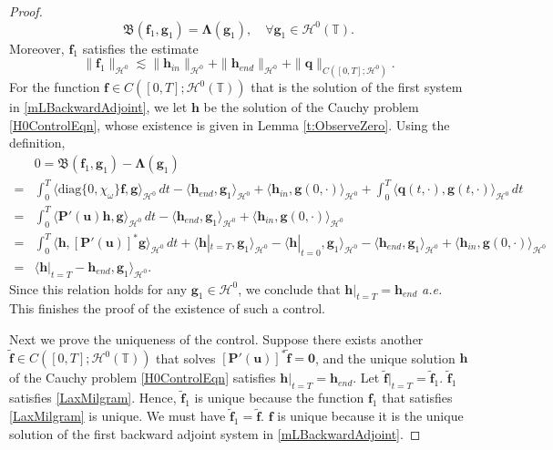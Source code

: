 \documentclass[12pt]{amsart}
\theoremstyle{remark}
\theoremstyle{definition}
\numberwithin{equation}{section}
\renewcommand{\H}{{\mathcal H }}
\newcommand{\T}{{\mathbb T}}
\begin{document}
\begin{proof}
\begin{equation} \label{LaxMilgram}
\mathfrak{B}( \mathbf{f}_1,  \mathbf{g}_1) = \mathbf{\Lambda}(\mathbf{g}_1), \quad \forall \mathbf{g}_1 \in \H^0(\T).
\end{equation}
Moreover, $\mathbf{f}_1$ satisfies the estimate
\begin{equation*}
    \|\mathbf{f}_1\|_{\H^0} \lesssim \|\mathbf{h}_{in}\|_{\H^0} + \|\mathbf{h}_{end}\|_{\H^0} + \|\mathbf{q}\|_{C([0,T];\H^0)}.
\end{equation*}
For the function $\mathbf{f}\in C([0,T]; \H^0(\T))$ that is the solution of the first system in \eqref{mLBackwardAdjoint}, we let $\mathbf{h}$ be the solution of the Cauchy problem \eqref{H0ControlEqn}, whose existence is given in Lemma \ref{t:ObserveZero}.
Using the definition,
\begin{align*}
 &0 = \mathfrak{B}( \mathbf{f}_1,  \mathbf{g}_1) - \mathbf{\Lambda}(\mathbf{g}_1) \\
 =& \int_0^T \langle \text{diag}\{0, \chi_\omega \}  \mathbf{f},  \mathbf{g}\rangle_{\H^0} \,dt - \langle   \mathbf{h}_{end},  \mathbf{g}_1\rangle_{\H^0} + \langle   \mathbf{h}_{in},  \mathbf{g}(0,\cdot)\rangle_{\H^0} +\int_0^T \langle   \mathbf{q}(t,\cdot),  \mathbf{g}(t,\cdot)\rangle_{\H^0} \,dt \\
 =& \int_0^T \langle \mathbf{P}'(\mathbf{u}) \mathbf{h},  \mathbf{g}\rangle_{\H^0} \,dt - \langle   \mathbf{h}_{end},  \mathbf{g}_1\rangle_{\H^0} + \langle   \mathbf{h}_{in},  \mathbf{g}(0,\cdot)\rangle_{\H^0}  \\
 =& \int_0^T \langle  \mathbf{h},  [\mathbf{P}'(\mathbf{u})]^*\mathbf{g}\rangle_{\H^0} \,dt + \langle   \mathbf{h}|_{t=T},  \mathbf{g}_1\rangle_{\H^0} - \langle   \mathbf{h}|_{t=0},  \mathbf{g}_1\rangle_{\H^0} - \langle   \mathbf{h}_{end},  \mathbf{g}_1\rangle_{\H^0} + \langle   \mathbf{h}_{in},  \mathbf{g}(0,\cdot)\rangle_{\H^0} \\
 =& \langle \mathbf{h}|_{t=T}-  \mathbf{h}_{end},  \mathbf{g}_1\rangle_{\H^0}. 
\end{align*}
Since this relation holds for any $\mathbf{g}_1\in \H^0$, we conclude that $\mathbf{h}|_{t=T}=  \mathbf{h}_{end}$ \textit{a.e.}
This finishes the proof of the existence of such a control.

Next we prove the uniqueness of the control. 
Suppose there exists another $\tilde{\mathbf{f}} \in C([0,T]; \H^0(\T))$ that solves $[\mathbf{P}'(\mathbf{u})]^*\tilde{\mathbf{f}} = \mathbf{0}$, and the unique solution $\mathbf{h}$ of the Cauchy problem \eqref{H0ControlEqn} satisfies $\mathbf{h}|_{t=T} = \mathbf{h}_{end}$.
Let $\tilde{\mathbf{f}}|_{t=T} = \tilde{\mathbf{f}}_1$.
$\tilde{\mathbf{f}}_1$ satisfies \eqref{LaxMilgram}.
Hence, $\tilde{\mathbf{f}}_1$ is unique because the function $\mathbf{f}_1$ that satisfies \eqref{LaxMilgram} is unique.
We must have $\tilde{\mathbf{f}}_1 = \tilde{\mathbf{f}}$.
$\mathbf{f}$ is unique because it is the unique solution of the first backward adjoint system in \eqref{mLBackwardAdjoint}.


\end{proof}
\end{document}
